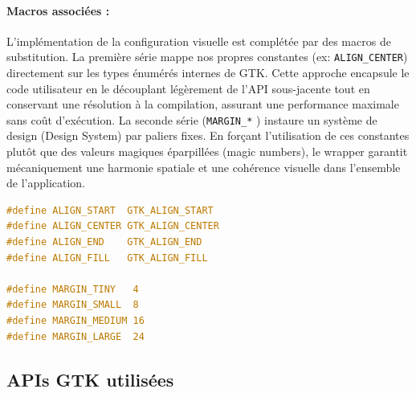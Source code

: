 \paragraph{Macros associées :}
L'implémentation de la configuration visuelle est complétée par des macros de substitution. La première série mappe nos propres constantes (ex: \texttt{ALIGN\_CENTER}) directement sur les types énumérés internes de GTK. Cette approche encapsule le code utilisateur en le découplant légèrement de l'API sous-jacente tout en conservant une résolution à la compilation, assurant une performance maximale sans coût d'exécution. La seconde série (\texttt{MARGIN\_*} ) instaure un système de design (Design System) par paliers fixes. En forçant l'utilisation de ces constantes plutôt que des valeurs magiques éparpillées (magic numbers), le wrapper garantit mécaniquement une harmonie spatiale et une cohérence visuelle dans l'ensemble de l'application.

\begin{lstlisting}[language=C]
#define ALIGN_START  GTK_ALIGN_START
#define ALIGN_CENTER GTK_ALIGN_CENTER
#define ALIGN_END    GTK_ALIGN_END
#define ALIGN_FILL   GTK_ALIGN_FILL

#define MARGIN_TINY   4
#define MARGIN_SMALL  8
#define MARGIN_MEDIUM 16
#define MARGIN_LARGE  24
\end{lstlisting}

\subsection{APIs GTK utilisées}

